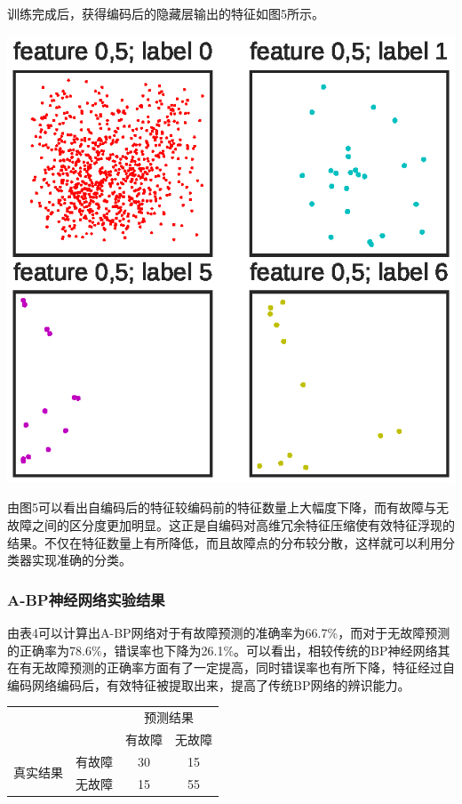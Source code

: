 \documentclass{ctacn}%
\begin{document}
\begin{multicols}{2}
训练完成后，获得编码后的隐藏层输出的特征如图5所示。

\begin{center}
	\includegraphics[scale=0.7, trim=0 0 0 0]{figs/autoencoder_encoded_features}\\
	\label{fig6}
\end{center}

由图5可以看出自编码后的特征较编码前的特征数量上大幅度下降，而有故障与无故障之间的区分度更加明显。这正是自编码对高维冗余特征压缩使有效特征浮现的结果。不仅在特征数量上有所降低，而且故障点的分布较分散，这样就可以利用分类器实现准确的分类。

\subsubsection{A-BP神经网络实验结果}

由表4可以计算出A-BP网络对于有故障预测的准确率为66.7\%，而对于无故障预测的正确率为78.6\%，错误率也下降为26.1\%。可以看出，相较传统的BP神经网络其在有无故障预测的正确率方面有了一定提高，同时错误率也有所下降，特征经过自编码网络编码后，有效特征被提取出来，提高了传统BP网络的辨识能力。

\begin{center}
	\label{tab:4}
	\begin{tabular} {cccc}\toprule
		\multirow{2}{*}[-2pt]{}&\multirow{2}{*}[-2pt]{}&\multicolumn{2}{c}{预测结果}\\
		\cmidrule(lr){3-4}
		&&有故障&无故障\\\hline
		\multirow{2}{*}[-2pt]{真实结果}&有故障&30&15\\
		&无故障&15&55\\
		\bottomrule
\end{tabular}\end{center}


\end{multicols}
\end{document}
